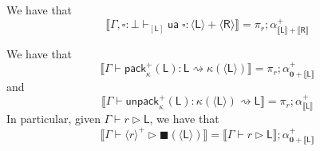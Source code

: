 \documentclass[acmsmall,screen,review]{acmart}
\newcommand{\mb}[1]{\ensuremath{\mathbf{#1}}}
\newcommand{\ms}[1]{\ensuremath{\mathsf{#1}}}
\newcommand{\bhyp}[2]{#1 : #2}
\newcommand{\hasty}[4]{#1 \vdash_{#2} #3: {#4}}
\newcommand{\haslb}[3]{#1 \vdash #2 \rhd #3}
\newcommand{\lbsubst}[4]{#1 \vdash #2: #3 \rightsquigarrow #4}
\newcommand{\dnt}[1]{\llbracket{#1}\rrbracket}
\newcommand{\invar}{\square}
\newcommand{\outlb}{\blacksquare}
\newcommand{\pckd}[1]{\langle #1 \rangle}
\begin{document}
\begin{lemma}
\begin{itemize}
  \end{itemize}
  \item We have that
  \begin{equation}
    \dnt{\hasty{\Gamma, \bhyp{\invar}{\bot}}{[\ms{L}]}{\ms{ua}\;\invar}
      {\pckd{\ms{L}} + \pckd{\ms{R}}}}
    = \pi_r ; \alpha^+_{\dnt{\ms{L}} + \dnt{\ms{R}}}
  \end{equation}
  \item We have that
  \begin{equation}
    \dnt{\lbsubst{\Gamma}{\ms{pack}_\kappa^+(\ms{L})}{\ms{L}}{\kappa(\pckd{\ms{L}})}}   
      = \pi_r ; \alpha^+_{\mb{0} + \dnt{\ms{L}}}
  \end{equation}
  and
  \begin{equation}
    \dnt{\lbsubst{\Gamma}{\ms{unpack}_\kappa^+(\ms{L})}{\kappa(\pckd{\ms{L}})}{\ms{L}}}
      = \pi_r ; \alpha^+_{\dnt{\ms{L}}}
  \end{equation}
  In particular, given $\haslb{\Gamma}{r}{\ms{L}}$, we have that
  \begin{equation}
    \dnt{\haslb{\Gamma}{\pckd{r}^+}{\outlb(\pckd{\ms{L}})}}
    = \dnt{\haslb{\Gamma}{r}{\ms{L}}} ; \alpha^+_{\mb{0} + \dnt{\ms{L}}}
  \end{equation}
\end{lemma}

\bohmjacopini*

\label{proof:bohm-jacopini}
\end{document}
